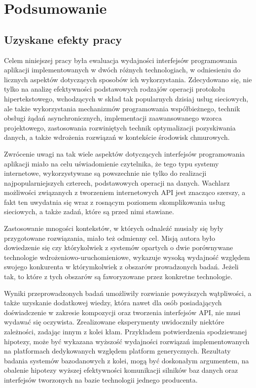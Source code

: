 \chapter{Podsumowanie}
\section{Uzyskane efekty pracy}
Celem niniejszej pracy była ewaluacja wydajności interfejsów programowania aplikacji implementowanych w dwóch różnych technologiach, w odniesieniu do licznych aspektów dotyczących sposobów ich wykorzystania. Zdecydowano się, nie tylko na analizę efektywności podstawowych rodzajów operacji protokołu hipertekstowego, wchodzących w skład tak popularnych dzisiaj usług sieciowych, ale także wykorzystania mechanizmów programowania współbieżnego, technik obsługi żądań asynchronicznych, implementacji zaawansowanego wzorca projektowego, zastosowania rozwiniętych technik optymalizacji pozyskiwania danych, a także wdrożenia rozwiązań w kontekście środowisk chmurowych.

Zwrócenie uwagi na tak wiele aspektów dotyczących interfejsów programowania aplikacji miało na celu uświadomienie czytelnika, że tego typu systemy internetowe, wykorzystywane są powszechnie nie tylko do realizacji najpopularniejszych czterech, podstawowych operacji na danych. Wachlarz możliwości związanych z tworzeniem internetowych API jest znacząco szerszy, a fakt ten uwydatnia się wraz z rosnącym poziomem skomplikowania usług sieciowych, a także zadań, które są przed nimi stawiane.

Zastosowanie mnogości kontekstów, w których odnaleźć musiały się były przygotowane rozwiązania, miało też odmienny cel. Misją autora było dowiedzenie się czy którykolwiek z systemów opartych o dwie porównywane technologie wdrożeniowo-uruchomieniowe, wykazuje wysoką wydajność względem swojego konkurenta w którymkolwiek z obszarów prowadzonych badań. Jeżeli tak, to które z tych obszarów są faworyzowane przez konkretne technologie.

Wyniki przeprowadzonych badań umożliwiły rozwianie powyższych wątpliwości, a także uzyskanie dodatkowej wiedzy, która nawet dla osób posiadających doświadczenie w zakresie kompozycji oraz tworzenia interfejsów API, nie musi wydawać się oczywista. Zrealizowane eksperymenty uwidoczniły niektóre zależności, zadając innym z kolei kłam. Przykładem potwierdzenia spodziewanej hipotezy, może być wykazana wyższość wydajności rozwiązań implementowanych na platformach dedykowanych względem platform generycznych. Rezultaty badania systemów bazodanowych z kolei, mogą być doskonałym argumentem, na obalenie hipotezy wyższej efektywności komunikacji silników baz danych oraz interfejsów tworzonych na bazie technologii jednego producenta.

